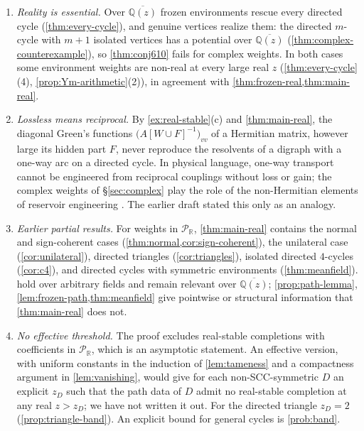 \documentclass[final]{siamart0516}
\numberwithin{theorem}{section}
\numberwithin{equation}{section}
\theoremstyle{siamnonum}
\theoremstyle{plain}
\newcommand{\QQ}{\mathbb{Q}}
\newcommand{\RR}{\mathbb{R}}
\newcommand{\Qzbar}{\overline{\QQ(z)}}
\newcommand{\Puis}{\mathcal{P}_{\RR}}
\begin{document}
\begin{remark}\label{rem:scope}
\begin{enumerate}[label=(\arabic*)]
\item \emph{Reality is essential.} Over $\Qzbar$ frozen environments rescue every directed cycle (\cref{thm:every-cycle}), and genuine vertices realize them: the directed $m$-cycle with $m+1$ isolated vertices has a potential over $\Qzbar$ (\cref{thm:complex-counterexample}), so \cref{thm:conj610} fails for complex weights. In both cases some environment weights are non-real at every large real $z$ (\cref{thm:every-cycle}(4), \cref{prop:Ym-arithmetic}(2)), in agreement with \cref{thm:frozen-real,thm:main-real}.
\item \emph{Lossless means reciprocal.} By \cref{ex:real-stable}(c) and \cref{thm:main-real}, the diagonal Green's functions $\bigl(A[W\cup F]^{-1}\bigr)_{vv}$ of a Hermitian matrix, however large its hidden part $F$, never reproduce the resolvents of a digraph with a one-way arc on a directed cycle. In physical language, one-way transport cannot be engineered from reciprocal couplings without loss or gain; the complex weights of \S\ref{sec:complex} play the role of the non-Hermitian elements of reservoir engineering \cite{MetelmannClerk}. The earlier draft stated this only as an analogy.
\item \emph{Earlier partial results.} For weights in $\Puis$, \cref{thm:main-real} contains the normal and sign-coherent cases (\cref{thm:normal,cor:sign-coherent}), the unilateral case (\cref{cor:unilateral}), directed triangles (\cref{cor:triangles}), isolated directed $4$-cycles (\cref{cor:c4}), and directed cycles with symmetric environments (\cref{thm:meanfield}).  hold over arbitrary fields and remain relevant over $\Qzbar$; \cref{prop:path-lemma}, \cref{lem:frozen-path,thm:meanfield} give pointwise or structural information that \cref{thm:main-real} does not.
\item \emph{No effective threshold.} The proof excludes real-stable completions with coefficients in $\Puis$, which is an asymptotic statement. An effective version, with uniform constants in the induction of \cref{lem:tameness} and a compactness argument in \cref{lem:vanishing}, would give for each non-SCC-symmetric $D$ an explicit $z_D$ such that the path data of $D$ admit no real-stable completion at any real $z>z_D$; we have not written it out. For the directed triangle $z_D=2$ (\cref{prop:triangle-band}). An explicit bound for general cycles is \cref{prob:band}.
\end{enumerate}
\end{remark}
\end{document}
